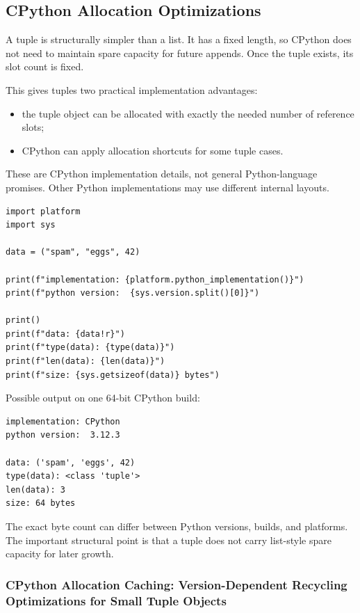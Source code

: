 \subsection{CPython Allocation Optimizations}

A tuple is structurally simpler than a list. It has a fixed length, so CPython does not need to maintain spare capacity for future appends. Once the tuple exists, its slot count is fixed.

This gives tuples two practical implementation advantages:

\begin{itemize}
    \item the tuple object can be allocated with exactly the needed number of reference slots;
    \item CPython can apply allocation shortcuts for some tuple cases.
\end{itemize}

These are CPython implementation details, not general Python-language promises. Other Python implementations may use different internal layouts.

\begin{verbatim}
import platform
import sys

data = ("spam", "eggs", 42)

print(f"implementation: {platform.python_implementation()}")
print(f"python version:  {sys.version.split()[0]}")

print()
print(f"data: {data!r}")
print(f"type(data): {type(data)}")
print(f"len(data): {len(data)}")
print(f"size: {sys.getsizeof(data)} bytes")
\end{verbatim}

Possible output on one 64-bit CPython build:

\begin{verbatim}
implementation: CPython
python version:  3.12.3

data: ('spam', 'eggs', 42)
type(data): <class 'tuple'>
len(data): 3
size: 64 bytes
\end{verbatim}

The exact byte count can differ between Python versions, builds, and platforms. The important structural point is that a tuple does not carry list-style spare capacity for later growth.

\subsubsection{CPython Allocation Caching: Version-Dependent Recycling Optimizations for Small Tuple Objects}

